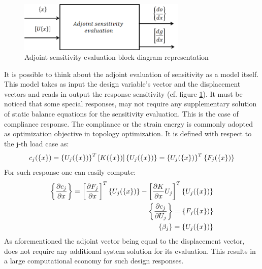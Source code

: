    \begin{figure}[ht]
   \centering
   \includegraphics[width=8cm]{images/Ch2/Adjoint}
   \caption{Adjoint sensitivity evaluation block diagram representation}
   \label{fig.2.6}
   \end{figure}
    It is possible to think about the adjoint evaluation of sensitivity as a model itself. This model takes as input the design variable's vector and the displacement vectors and reads in output the response sensitivity (cf. figure \ref{fig.2.6}).
    It must be noticed that some special responses, may not require any supplementary solution of static balance equations for the sensitivity evaluation. This is the case of compliance response. The compliance or the strain energy is commonly adopted as optimization objective in topology optimization. It is defined with respect to the j-th load case as:
    \begin{equation}
    c_j(\left\lbrace{x}\right \rbrace)=\left\lbrace{ U_j (\ensuremath\left\lbrace{x}\right \rbrace)}\right \rbrace^T \left[{K(\left\lbrace{x}\right \rbrace)}\right]\left\lbrace{ U_j (\ensuremath\left\lbrace{x}\right \rbrace)}\right \rbrace=\left\lbrace{ U_j (\ensuremath\left\lbrace{x}\right \rbrace)}\right \rbrace^T\left\lbrace{ F_j (\ensuremath\left\lbrace{x}\right \rbrace)}\right \rbrace
    \end{equation}
   For such response one can easily compute:
   \begin{eqnarray}
   \left\lbrace{\frac{\partial c_j}{\partial x}}\right \rbrace=\left[{ \frac{\partial F_j}{\partial x}}\right]^T\left\lbrace{ U_j (\ensuremath\left\lbrace{x}\right \rbrace)}\right \rbrace-\left[{\frac{\partial K}{\partial x}U_j}\right]^T\left\lbrace{ U_j (\ensuremath\left\lbrace{x}\right \rbrace)}\right \rbrace\\
    \left\lbrace{\frac{\partial c_j}{\partial U_j}}\right \rbrace=\left\lbrace{ F_j (\ensuremath\left\lbrace{x}\right \rbrace)}\right \rbrace\\
    \left\lbrace{\beta_j}\right \rbrace=\left\lbrace{ U_j (\ensuremath\left\lbrace{x}\right \rbrace)}\right \rbrace
   \end{eqnarray}
   As aforementioned the adjoint vector being equal to the displacement vector, does not require any additional system solution for its evaluation. This results in a large computational economy for such design responses.
